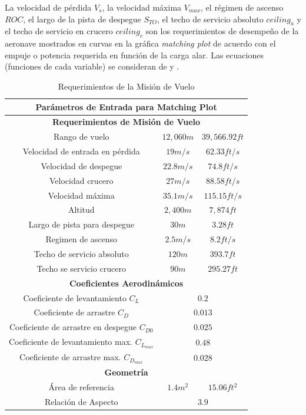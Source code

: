 La velocidad de pérdida $V_s$, la velocidad máxima $V_{max}$, el régimen de ascenso $ROC$, el largo de la pista de despegue $S_{TO}$, el techo de servicio absoluto $ceiling_a$ y el techo de servicio en crucero $ceiling_c$ son los requerimientos de desempeño de la aeronave mostrados en curvas en la gráfica \textit{matching plot} de acuerdo con el empuje o potencia requerida en función de la carga alar. 
%
Las ecuaciones (funciones de cada variable) se consideran de \cite{Mohammad2020} y \cite{Sadraey2013}. 

\begin{table}[!h]
    \caption{Requerimientos de la Misión de Vuelo}
    \centering
    \begin{tabular}{|c|c|c|}
    \hline
    \multicolumn{3}{|c|}{\textbf{Parámetros de Entrada para Matching Plot} } \\
    \hline
    \multicolumn{3}{|c|}{\textbf{Requerimientos de Misión de Vuelo}} \\
    \hline
    Rango de vuelo & $12, 060 m$ & $39, 566.92 ft$ \\
    \hline
    Velocidad de entrada en pérdida & $19 m/s$ & $62.33 ft/s$  \\
    \hline
    Velocidad de despegue &  $22.8 m/s$ & $74.8 ft/s$ \\
    \hline
    Velocidad crucero & $27 m/s$ & $88.58 ft/s$ \\
    \hline
    Velocidad máxima & $35.1 m/s$ & $115.15 ft/s$ \\
    \hline
    Altitud & $2, 400 m$ & $7, 874 ft$\\
    \hline
    Largo de pista para despegue & $30 m$ & $3.28 ft$ \\
    \hline
    Regimen de ascenso & $2.5 m/s$ & $8.2 ft/s$ \\
    \hline
    Techo de servicio absoluto & $120 m$ & $393.7 ft$ \\
    \hline
    Techo se servicio crucero & $90 m$ & $295.27 ft$ \\
    \hline
    \multicolumn{3}{|c|}{\textbf{Coeficientes Aerodinámicos}} \\
    \hline
    Coeficiente de levantamiento $C_L$ & \multicolumn{2}{|c|}{$0.2$} \\
    \hline
    Coeficiente de arrastre $C_D$ & \multicolumn{2}{|c|}{$0.013$}  \\
    \hline
    Coeficiente de arrastre en despegue $C_{D0}$ & \multicolumn{2}{|c|}{$0.025$} \\
    \hline
    Coeficiente de levantamiento max. $C_{L_{max}}$ & \multicolumn{2}{|c|}{$0.48$} \\
    \hline
    Coeficiente de arrastre max. $C_{D_{max}}$ & \multicolumn{2}{|c|}{$0.028$}  \\
    \hline
    \multicolumn{3}{|c|}{\textbf{Geometría}} \\
    \hline
    Área de referencia & $1.4m^2$ & $15.06 ft^2$ \\
    \hline
    Relación de Aspecto & \multicolumn{2}{|c|}{$3.9$} \\
    \hline
    \end{tabular}
    \label{Requerimientos de la misión de vuelo}
\end{table}
